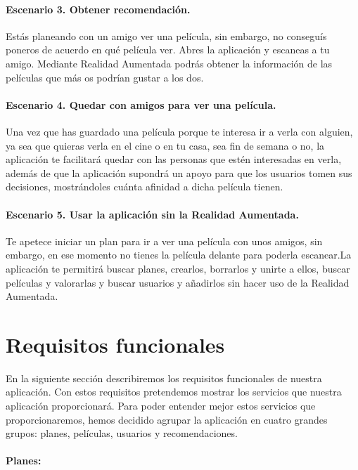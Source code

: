 \paragraph{Escenario 3. Obtener recomendación.}
    Estás planeando con un amigo ver una película, sin embargo, no conseguís poneros de acuerdo en qué película ver. Abres la aplicación y escaneas a tu amigo. Mediante Realidad Aumentada podrás obtener la información de las películas que más os podrían gustar a los dos. 



\paragraph{Escenario 4. Quedar con amigos para ver una película.}
    Una vez que has guardado una película porque te interesa ir a verla con alguien, ya sea que quieras verla en el cine o en tu casa, sea fin de semana o no, la aplicación te facilitará quedar 
    con las personas que estén interesadas en verla, además de que la aplicación supondrá un apoyo para que los usuarios tomen sus decisiones, mostrándoles cuánta afinidad a dicha película tienen.

\paragraph{Escenario 5. Usar la aplicación sin la Realidad Aumentada.}
    Te apetece iniciar un plan para ir a ver una película con unos amigos, sin embargo, en ese momento no tienes la película 
    delante para poderla escanear.La aplicación te permitirá buscar 
     planes, crearlos, borrarlos y unirte a ellos, buscar películas y valorarlas y buscar usuarios y añadirlos sin hacer uso de la Realidad Aumentada.

\section{Requisitos funcionales}
\label{makereference3.3}
En la siguiente sección describiremos los requisitos funcionales de nuestra aplicación. Con estos requisitos pretendemos mostrar los servicios que nuestra aplicación proporcionará.
Para poder entender mejor estos servicios que proporcionaremos, hemos decidido agrupar la aplicación en cuatro grandes grupos: planes, películas, usuarios y recomendaciones.

\paragraph{\large Planes:\\}


